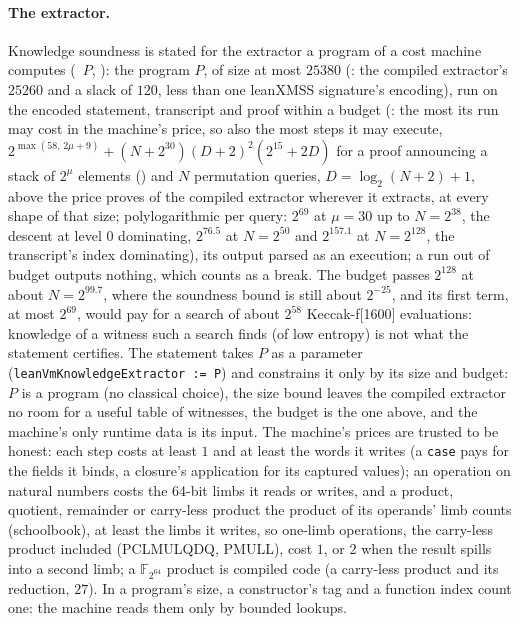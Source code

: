 \documentclass[11pt]{article}
\begin{document}
\paragraph{The extractor.} Knowledge soundness is stated for the extractor a program of a cost
machine computes (~$P$, ): the
program $P$, of size at most $25380$ (: the compiled
extractor's $25260$ and a slack of $120$, less than one leanXMSS signature's encoding), run on the encoded
statement, transcript and proof within a budget (: the most its
run may cost in the machine's price, so also the most steps it may execute,
$2^{\max(58,\,2\mu + 9)} + (N + 2^{30})(D + 2)^2(2^{15} + 2D)$ for a proof announcing a stack of $2^\mu$
elements () and $N$ permutation queries, $D = \log_2(N + 2) + 1$, above the
price  proves of the compiled extractor wherever it extracts, at every shape of that size; polylogarithmic
per query: $2^{69}$ at $\mu = 30$ up to $N = 2^{38}$, the descent at level 0 dominating, $2^{76.5}$ at $N = 2^{50}$
and $2^{157.1}$ at $N = 2^{128}$, the transcript's index dominating), its output
parsed as an execution; a run out of budget outputs nothing, which counts as a break. The budget
passes $2^{128}$ at about $N = 2^{99.7}$, where the soundness bound is still about $2^{-25}$, and its first
term, at most $2^{69}$, would pay for a search of about $2^{58}$ Keccak-f[1600] evaluations: knowledge
of a witness such a search finds
(of low entropy) is not what the statement certifies. The
statement takes $P$ as a parameter (\texttt{leanVmKnowledgeExtractor := P}) and constrains it only
by its size and budget: $P$ is a program (no classical choice), the size bound leaves the compiled
extractor no room for a useful table of witnesses, the budget is the one above, and the machine's
only runtime data is its input. The machine's prices are trusted to be honest: each step costs at
least $1$ and at least the words it writes (a \texttt{case} pays for the fields it binds, a
closure's application for its captured values); an operation on natural numbers costs the 64-bit
limbs it reads or writes, and a product, quotient, remainder or carry-less product the product of
its operands' limb counts (schoolbook), at least the limbs it writes, so one-limb operations, the
carry-less product included (PCLMULQDQ, PMULL), cost $1$, or $2$ when the result spills into a
second limb; a $\mathbb{F}_{2^{64}}$ product is compiled code (a carry-less product
and its reduction, $27$). In a program's size, a constructor's tag and a function index count one:
the machine reads them only by bounded lookups.
\end{document}
